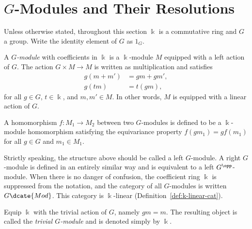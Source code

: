 \section{\texorpdfstring{$G$}{G}-Modules and Their Resolutions}\label{sec:G-mod}

Unless otherwise stated, throughout this section $\Bbbk$ is a commutative ring
and $G$ a group. Write the identity element of $G$ as $1_G$.

\begin{definition}\label{def:G-mod}
	A \emph{$G$-module} with coefficients in $\Bbbk$ is a $\Bbbk$-module $M$
	equipped with a left action of $G$. The action $G\times M\to M$ is written
	as multiplication and satisfies
	\begin{align*}
		g(m + m') & = gm + gm', \\
		g(tm) & = t(gm),
	\end{align*}
	for all $g\in G$, $t\in\Bbbk$, and $m,m'\in M$. In other words, $M$ is
	equipped with a linear action of $G$.

	A homomorphism $f:M_1\to M_2$ between two $G$-modules is defined to be a
	$\Bbbk$-module homomorphism satisfying the equivariance property
	$f(gm_1)=gf(m_1)$ for all $g\in G$ and $m_1\in M_1$.
\end{definition}

Strictly speaking, the structure above should be called a left $G$-module. A
right $G$-module is defined in an entirely similar way and is equivalent to a
left $G^{\opp}$-module. When there is no danger of confusion, the coefficient
ring $\Bbbk$ is suppressed from the notation, and the category of all
$G$-modules is written $G\dcate{Mod}$. This category is $\Bbbk$-linear
(Definition~\ref{def:k-linear-cat}).

\begin{example}\label{eg:trivial-G-mod}
	Equip $\Bbbk$ with the trivial action of $G$, namely $gm=m$. The resulting
	object is called the \emph{trivial $G$-module} and is denoted simply by
	$\Bbbk$.
\end{example}

